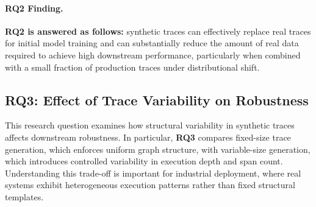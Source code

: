 \documentclass[sigconf,review]{acmart}
\begin{document}
\begin{table}
    \centering
    \caption{Classification performance with 10\% real data + synthetic data}
    \label{tab:real_data+synth-classification}
\end{table}

\paragraph{RQ2 Finding.}
\textbf{RQ2 is answered as follows:} synthetic traces can effectively replace real traces for initial model training and can substantially reduce the amount of real data required to achieve high downstream performance, particularly when combined with a small fraction of production traces under distributional shift.


\subsection{RQ3: Effect of Trace Variability on Robustness}
\label{sec:rq3}

This research question examines how structural variability in synthetic traces affects downstream robustness. In particular, \textbf{RQ3} compares fixed-size trace generation, which enforces uniform graph structure, with variable-size generation, which introduces controlled variability in execution depth and span count. Understanding this trade-off is important for industrial deployment, where real systems exhibit heterogeneous execution patterns rather than fixed structural templates.
\end{document}
